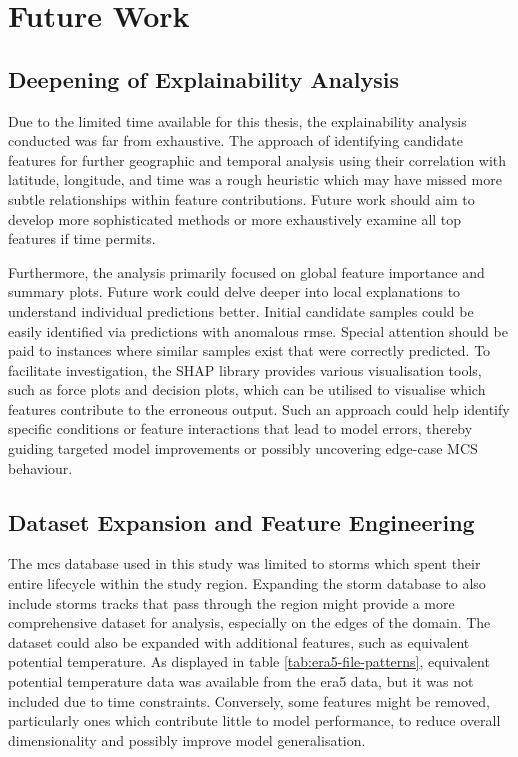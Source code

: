 \section{Future Work}

\subsection{Deepening of Explainability Analysis}

Due to the limited time available for this thesis, the explainability analysis conducted was far from exhaustive. The approach of identifying candidate features for further geographic and temporal analysis using their correlation with latitude, longitude, and time was a rough heuristic which may have missed more subtle relationships within feature contributions. Future work should aim to develop more sophisticated methods or more exhaustively examine all top features if time permits.

Furthermore, the analysis primarily focused on global feature importance and summary plots. Future work could delve deeper into local explanations to understand individual predictions better. Initial candidate samples could be easily identified via predictions with anomalous \acrshort{rmse}. Special attention should be paid to instances where similar samples exist that were correctly predicted. To facilitate investigation, the SHAP library provides various visualisation tools, such as force plots and decision plots, which can be utilised to visualise which features contribute to the erroneous output. Such an approach could help identify specific conditions or feature interactions that lead to model errors, thereby guiding targeted model improvements or possibly uncovering edge-case MCS behaviour.

\subsection{Dataset Expansion and Feature Engineering}

The \acrshort{mcs} database used in this study was limited to storms which spent their entire lifecycle within the study region. Expanding the storm database to also include storms tracks that pass through the region might provide a more comprehensive dataset for analysis, especially on the edges of the domain. The dataset could also be expanded with additional features, such as equivalent potential temperature. As displayed in table \ref{tab:era5-file-patterns}, equivalent potential temperature data was available from the \acrshort{era5} data, but it was not included due to time constraints. Conversely, some features might be removed, particularly ones which contribute little to model performance, to reduce overall dimensionality and possibly improve model generalisation.

